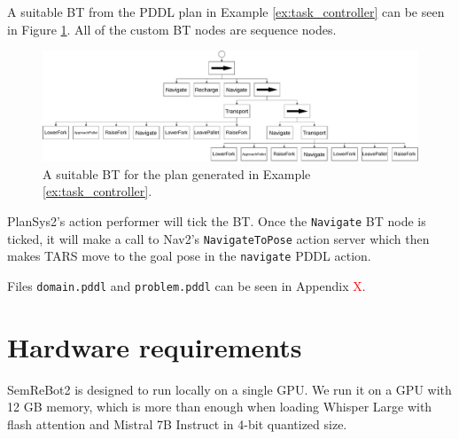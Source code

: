 \begin{example}\label{ex:bt_builder}
    A suitable BT from the PDDL plan in Example \ref{ex:task_controller} can be seen in Figure \ref{fig:example_bt}. All of the custom BT nodes are sequence nodes.

    \begin{figure}[ht]
        \centering
        \includegraphics[width=\textwidth]{figures/example_bt.pdf}
        \caption[BT from SemReBot2 example]{A suitable BT for the plan generated in Example \ref{ex:task_controller}.}
        \label{fig:example_bt}
    \end{figure}
\end{example}

PlanSys2's action performer will tick the BT. Once the \verb|Navigate| BT node is ticked, it will make a call to Nav2's \verb|NavigateToPose| action server which then makes TARS move to the goal pose in the \verb|navigate| PDDL action.

Files \verb|domain.pddl| and \verb|problem.pddl| can be seen in Appendix \textcolor{red}{X}.

\section{Hardware requirements}
SemReBot2 is designed to run locally on a single GPU. We run it on a GPU with 12 GB memory, which is more than enough when loading Whisper Large with flash attention and Mistral 7B Instruct in 4-bit quantized size.